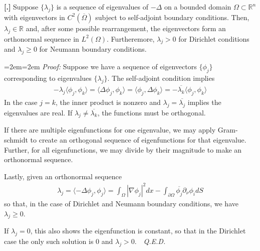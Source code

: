\documentclass{article}
\newcommand{\R}{{\mathbb{R}}}
\newcommand{\cl}[1]{{\overline{#1}}}
\newcommand{\pd}{\partial}
\newcounter{result}[section]
\newenvironment{res}[1][]{\refstepcounter{result}\par\medskip
	\noindent \textbf{[\thesection.\theresult] #1} \rmfamily}{\medskip}
\newenvironment{pf}{%
	\par%
	\medskip
	\leftskip=2em\rightskip=2em%
	\noindent\ignorespaces \textit{Proof:} \newline}{%
	\,\, \newline \textit{Q.E.D.}\par\medskip}
\begin{document}
	\vspace{0.25 cm}
	
	\begin{res}
		Suppose $\{\lambda_{j} \}$ is a sequence of eigenvalues of $-\Delta$ on a bounded domain $\Omega \subset \R^{n}$ with eigenvectors in $C^{2}(\cl{\Omega})$ subject to self-adjoint boundary conditions. Then, $\lambda_{j} \in \R$ and, after some possible rearrangement, the eigenvectors form an orthonormal sequence in $L^{2}(\Omega)$. Furtheremore, $\lambda_{j} > 0$ for Dirichlet conditions and $\lambda_{j} \geq 0$ for Neumann boundary conditions.  
	\end{res}
	
	\begin{pf}
		Suppose we have a sequence of eigenvectors $\{\phi_{j}\}$ corresponding to eigenvalues $\{\lambda_{j}\}$. The self-adjoint condition implies 
		\begin{align*}
			-\lambda_{j} \langle \phi_{j}, \phi_{k} \rangle = \langle \Delta \phi_{j}, \phi_{k} \rangle  = \langle \phi_{j}, \Delta \phi_{k} \rangle  = -\cl{\lambda_{k}} \langle \phi_{j}, \phi_{k} \rangle 
		\end{align*}
		In the case $j=k$, the inner product is nonzero and $\lambda_{j} = \cl{\lambda_{j}}$ implies the eigenvalues are real. If $\lambda_{j}\neq \cl{\lambda_{k}}$, the functions must be orthogonal.
		
		If there are multiple eigenfunctions for one eigenvalue, we may apply Gram-schmidt to create an orthogonal sequence of eigenfunctions for that eigenvalue. Further, for all eigenfunctions, we may divide by their magnitude to make an orthonormal sequence. 
		
		Lastly, given an orthonormal sequence
		\begin{align*}
			\lambda_{j} = \langle -\Delta \phi_{j},\phi_{j} \rangle  = \int_{\Omega} |\nabla \phi_{j} |^{2} dx - \int_{\pd \Omega} \cl{\phi_{j}} \pd_{\nu} \phi_{i} dS
		\end{align*}
		so that, in the case of Dirichlet and Neumann boundary conditions, we have $\lambda_{j}\geq 0$. 
		
		If $\lambda_{j} = 0$, this also shows the eigenfunction is constant, so that in the Dirichlet case the only such solution is $0$ and $\lambda_{j} > 0$. 
	\end{pf}


	
\end{document}

